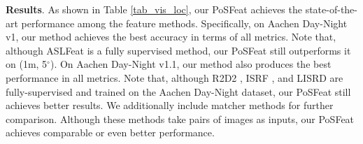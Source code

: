 \documentclass[10pt,twocolumn,letterpaper]{article}
\begin{document}
\noindent\textbf{Results}. As shown in Table \ref{tab_vis_loc}, our PoSFeat achieves the state-of-the-art performance among the feature methods. Specifically, on Aachen Day-Night v1, our method achieves the best accuracy in terms of all metrics. Note that, although ASLFeat is a fully supervised method, our PoSFeat still outperforms it on (1m, 5$^\circ$). On Aachen Day-Night v1.1, our method also produces the best performance in all metrics. Note that, although R2D2 \cite{revaud2019r2d2}, ISRF \cite{melekhov2020image}, and LISRD \cite{pautrat2020online} are fully-supervised and trained on the Aachen Day-Night dataset, our PoSFeat still achieves better results. We additionally include  matcher methods for further comparison. Although these methods take pairs of images as inputs, our PoSFeat achieves comparable or even better performance.
\end{document}
